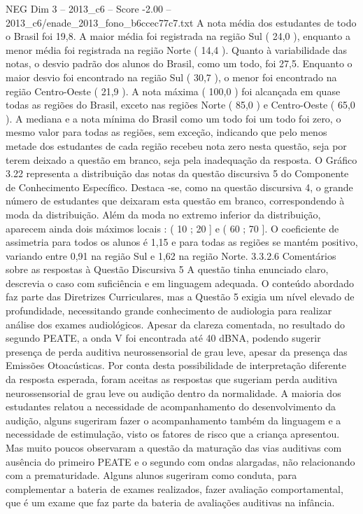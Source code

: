 \begin{textsample}{NEG Dim 3 – 2013\_c6 – Score -2.00 – 2013\_c6/enade\_2013\_fono\_b6ccec77c7.txt}
A nota média dos estudantes de todo o Brasil foi 19,8.
A maior média foi registrada na região Sul ( 24,0 ), enquanto a menor média foi registrada na região Norte ( 14,4 ).
Quanto à variabilidade das notas, o desvio padrão dos alunos do Brasil, como um todo, foi 27,5.
Enquanto o maior desvio foi encontrado na região Sul ( 30,7 ), o menor foi encontrado na região Centro-Oeste ( 21,9 ).
A nota máxima ( 100,0 ) foi alcançada em quase todas as regiões do Brasil, exceto nas regiões Norte ( 85,0 ) e Centro-Oeste ( 65,0 ).
A mediana e a nota mínima do Brasil como um todo foi um todo foi zero, o mesmo valor para todas as regiões, sem exceção, indicando que pelo menos metade dos estudantes de cada região recebeu nota zero nesta questão, seja por terem deixado a questão em branco, seja pela inadequação da resposta.
O Gráfico 3.22 representa a distribuição das notas da questão discursiva 5 do Componente de Conhecimento Específico.
Destaca -se, como na questão discursiva 4, o grande número de estudantes que deixaram esta questão em branco, correspondendo à moda da distribuição.
Além da moda no extremo inferior da distribuição, aparecem ainda dois máximos locais : ( 10 ; 20 ] e ( 60 ; 70 ].
O coeficiente de assimetria para todos os alunos é 1,15 e para todas as regiões se mantém positivo, variando entre 0,91 na região Sul e 1,62 na região Norte. 3.3.2.6 Comentários sobre as respostas à Questão Discursiva 5 A questão tinha enunciado claro, descrevia o caso com suficiência e em linguagem adequada.
O conteúdo abordado faz parte das Diretrizes Curriculares, mas a Questão 5 exigia um nível elevado de profundidade, necessitando grande conhecimento de audiologia para realizar análise dos exames audiológicos.
Apesar da clareza comentada, no resultado do segundo PEATE, a onda V foi encontrada até 40 dBNA, podendo sugerir presença de perda auditiva neurossensorial de grau leve, apesar da presença das Emissões Otoacústicas.
Por conta desta possibilidade de interpretação diferente da resposta esperada, foram aceitas as respostas que sugeriam perda auditiva neurossensorial de grau leve ou audição dentro da normalidade.
A maioria dos estudantes relatou a necessidade de acompanhamento do desenvolvimento da audição, alguns sugeriram fazer o acompanhamento também da linguagem e a necessidade de estimulação, visto os fatores de risco que a criança apresentou.
Mas muito poucos observaram a questão da maturação das vias auditivas com ausência do primeiro PEATE e o segundo com ondas alargadas, não relacionando com a prematuridade.
Alguns alunos sugeriram como conduta, para complementar a bateria de exames realizados, fazer avaliação comportamental, que é um exame que faz parte da bateria de avaliações auditivas na infância.

\end{textsample}
